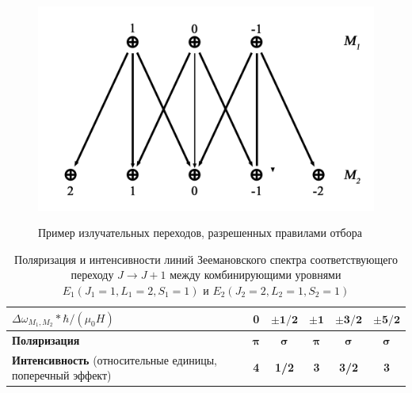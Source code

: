 \begin{figure}[H]
    \centering
    \includegraphics[width=.7\textwidth]{fig/fig3.pdf}
    \label{fig:3}
    \caption{Пример излучательных переходов, разрешенных правилами отбора}    
\end{figure}


\begin{table}[H]
    \setlength{\tabcolsep}{6pt}
    \caption{Поляризация и интенсивности линий Зеемановского спектра соответствующего переходу $J \rightarrow J+1$ между комбинирующими уровнями $ E_1(J_1=1,L_1=2,S_1=1)$ и $E_2(J_2=2,L_2=1,S_2=1) $} 
    \centering 
    \label{tab:2}
    \begin{tabular}{|p{8cm}|c|c|c|c|c|}
    \hline
    $\Delta \omega_{M_1 , M_2} * \hbar / (\mu_0 H) $ & \textbf{0} & $\mathbf{\pm 1/2}$ & $\mathbf{\pm 1}$ & $\mathbf{\pm 3/2}$ & $\mathbf{\pm 5/2}$ \\ \hline
    \textbf{Поляризация}  & $\mathbf{\boldsymbol\pi}$ & $ \mathbf{\boldsymbol\sigma} $ & $\mathbf{\boldsymbol\pi}$ & $ \mathbf{\boldsymbol\sigma} $ & $\mathbf{\boldsymbol\sigma} $ \\ \hline
    \textbf{Интенсивность}  (относительные единицы, поперечный эффект) & \textbf{4} &  \textbf{1/2} & \textbf{3}  &  \textbf{3/2} & \textbf{3} \\ \hline
    \end{tabular}
\end{table}
